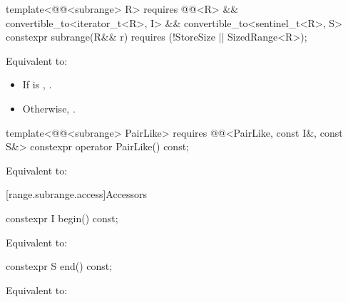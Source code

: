 %
\begin{itemdecl}
template<@@<subrange> R>
  requires @@<R> &&
           convertible_to<iterator_t<R>, I> && convertible_to<sentinel_t<R>, S>
constexpr subrange(R&& r) requires (!StoreSize || SizedRange<R>);
\end{itemdecl}

\begin{itemdescr}
\pnum
\effects Equivalent to:
\begin{itemize}
\item If  is ,
.
\item Otherwise, .
\end{itemize}
\end{itemdescr}

%
\begin{itemdecl}
template<@@<subrange> PairLike>
  requires @@<PairLike, const I&, const S&>
constexpr operator PairLike() const;
\end{itemdecl}

\begin{itemdescr}
\pnum
\effects Equivalent to: 
\end{itemdescr}

[range.subrange.access]{Accessors}

%
\begin{itemdecl}
constexpr I begin() const;
\end{itemdecl}

\begin{itemdescr}
\pnum
\effects Equivalent to: 
\end{itemdescr}

%
\begin{itemdecl}
constexpr S end() const;
\end{itemdecl}

\begin{itemdescr}
\pnum
\effects Equivalent to: 
\end{itemdescr}


